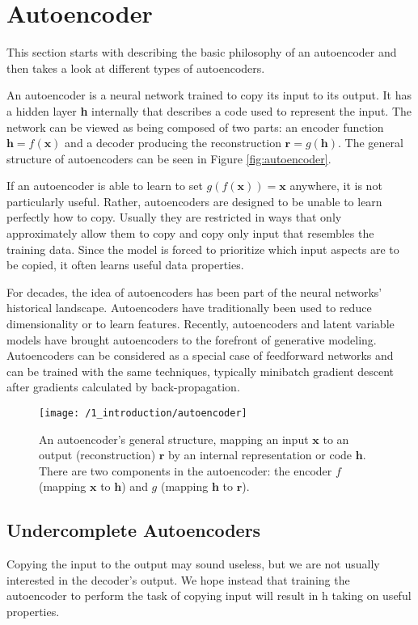 \section{Autoencoder}\label{sec:autoencoder}
This section starts with describing the basic philosophy of an autoencoder and
then takes a look at different types of autoencoders.

An autoencoder is a neural network trained to copy its input to its output. It
has a hidden layer \textbf{h} internally that describes a code used to represent
the input. The network can be viewed as being composed of two parts: an encoder
function $\textbf{h} = f(\textbf{x})$ and a decoder producing the reconstruction
$\textbf{r} = g(\textbf{h})$. The general structure of autoencoders can be seen
in Figure \ref{fig:autoencoder}.

If an autoencoder is able to learn to set $g(f(\textbf{x}))=\textbf{x}$
anywhere, it is not particularly useful. Rather, autoencoders are designed to be
unable to learn perfectly how to copy. Usually they are restricted in ways that
only approximately allow them to copy and copy only input that resembles the
training data. Since the model is forced to prioritize which input aspects are
to be copied, it often learns useful data properties. 

For decades, the idea of autoencoders has been part of the neural networks'
historical landscape. Autoencoders have traditionally been used to reduce
dimensionality or to learn features. Recently, autoencoders and latent variable
models have brought autoencoders to the forefront of generative modeling.
Autoencoders can be considered as a special case of feedforward networks and can
be trained with the same techniques, typically minibatch gradient descent after
gradients calculated by back-propagation. 

\begin{figure}[h]
    \centering
    \texttt{[image: /1\_introduction/autoencoder]}
    \caption{An autoencoder's general structure, mapping an input $\textbf{x}$
    to an output (reconstruction) $\textbf{r}$ by an internal representation or
    code $\textbf{h}$. There are two components in the autoencoder: the encoder
    $f$ (mapping $\textbf{x}$ to $\textbf{h}$) and $g$ (mapping $\textbf{h}$ to
    $\textbf{r}$).}
\end{figure}


\subsection{Undercomplete Autoencoders}
Copying the input to the output may sound useless, but we are not usually
interested in the decoder's output. We hope instead that training the
autoencoder to perform the task of copying input will result in h taking on
useful properties.


